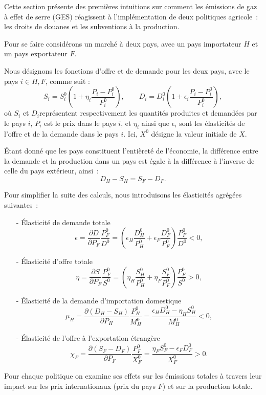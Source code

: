 
Cette section présente des premières intuitions sur comment les émissions de gaz à effet de serre (GES) réagissent à l’implémentation de deux politiques agricole~: les droits de douanes et les subventions à la production.

Pour se faire considérons un marché à deux pays, avec un pays importateur $H$ et un pays exportateur $F$.

Nous désignons les fonctions d’offre et de demande pour les deux pays, avec le pays $i \in {H, F}$, comme suit :
$$
S_i = S_i^0\left(1 + \eta_i\frac{P_i - P_i^0}{P_i^0}\right), \qquad
D_i = D_i^0\left(1 + \epsilon_i\frac{P_i - P_i^0}{P_i^0}\right),
$$
où $S_i$ et $D_i$représentent respectivement les quantités produites et demandées par le pays $i$, $P_i$ est le prix dans le pays $i$, et $\eta_i$ ainsi que $\epsilon_i$ sont les élasticités de l’offre et de la demande dans le pays $i$. Ici, $X^0$ désigne la valeur initiale de $X$.

Étant donné que les pays constituent l’entièreté de l’économie, la différence entre la demande et la production dans un pays est égale à la différence à l’inverse de celle du pays extérieur, ainsi~:
$$
D_H - S_H = S_F - D_F.
$$

Pour simplifier la suite des calculs, nous introduisons les élasticités agrégées suivantes~:
\begin{itemize}
    \item[-] Élasticité de demande totale
    $$
    \epsilon = \frac{\partial D}{\partial P_F} \frac{P_F^0}{D^0} = \left( \epsilon_H \frac{D_H^0}{P_H^0} + \epsilon_F \frac{D_F^0}{P_F^0} \right)\frac{P_F^0}{D^0} < 0,
    $$
    \item[-] Élasticité d’offre totale
    $$
    \eta = \frac{\partial S}{\partial P_F} \frac{P_F^0}{S^0} = \left( \eta_H \frac{S_H^0}{P_H^0} + \eta_F \frac{S_F^0}{P_F^0} \right)\frac{P_F^0}{S^0} > 0,
    $$
    \item[-] Élasticité de la demande d’importation domestique
    $$
    \mu_H = \frac{\partial (D_H - S_H)}{\partial P_H} \frac{P_H^0}{M_H^0} = \frac{\epsilon_H D_H^0 - \eta_H S_H^0}{M_H^0} < 0,
    $$
    \item[-] Élasticité de l’offre à l’exportation étrangère
    $$
    \chi_F = \frac{\partial (S_F - D_F)}{\partial P_F} \frac{P_F^0}{X_F^0} = \frac{\eta_F S_F^0 - \epsilon_F D_F^0}{X_F^0} > 0.
    $$
\end{itemize}

Pour chaque politique on examine ses effets sur les émissions totales à travers leur impact sur les prix internationaux (prix du pays $F$) et sur la production totale.

